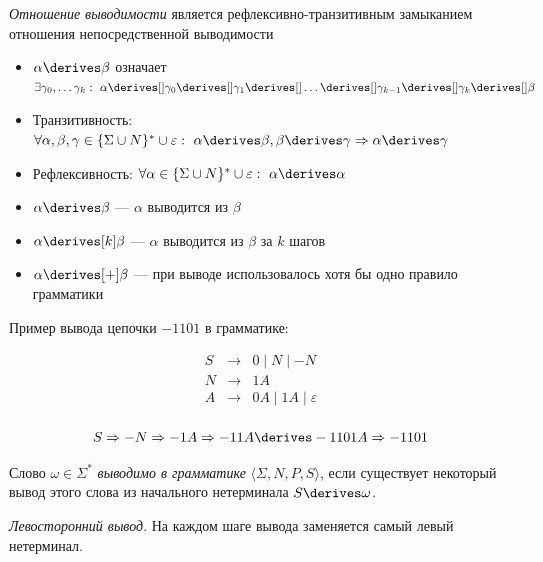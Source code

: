 \begin{definition}
\textit{Отношение выводимости} является рефлексивно-транзитивным замыканием отношения непосредственной выводимости
\begin{itemize}
  \item $\alpha \derives \beta$ означает $\exists \gamma_0, \dots \gamma_k: \ \alpha \derives[] \gamma_0 \derives[] \gamma_1 \derives[] \dots \derives[] \gamma_{k-1} \derives[] \gamma_{k} \derives[] \beta$
  \item Транзитивность: $\forall \alpha, \beta, \gamma \in \{\Sigma \cup N\}^* \cup {\varepsilon}: \ \alpha \derives \beta, \beta \derives \gamma \Rightarrow \alpha \derives \gamma$
  \item Рефлексивность: $\forall \alpha \in \{\Sigma \cup N\}^* \cup {\varepsilon}: \ \alpha \derives \alpha$
  \item $\alpha \derives \beta$ --- $\alpha$ выводится из $\beta$
  \item $\alpha \derives[k] \beta$ --- $\alpha$ выводится из $\beta$ за $k$ шагов
  \item $\alpha \derives[+] \beta$ --- при выводе использовалось хотя бы одно правило грамматики
\end{itemize}
\end{definition}


\begin{example}
Пример вывода цепочки $-1101$ в грамматике:

  \[
  \begin{array}{rcl}
  S& \rightarrow & 0 \mid N \mid - N  \\
  N& \rightarrow & 1 A \\
  A& \rightarrow & 0 A \mid 1 A  \mid \varepsilon\\
  \end{array}
  \]

  \[ S \Rightarrow - N \Rightarrow - 1 A \Rightarrow - 1 1 A \derives - 1 1 0 1 A \Rightarrow - 1 1 0 1 \]
\end{example}


\begin{definition}
Слово $\omega \in \Sigma^*$ \textit{выводимо в грамматике} $\langle \Sigma, N, P, S \rangle$, если существует некоторый вывод этого слова из начального нетерминала $S \derives \omega$.

\end{definition}

\begin{definition}
\textit{Левосторонний вывод}. На каждом шаге вывода заменяется самый левый нетерминал.
\end{definition}

